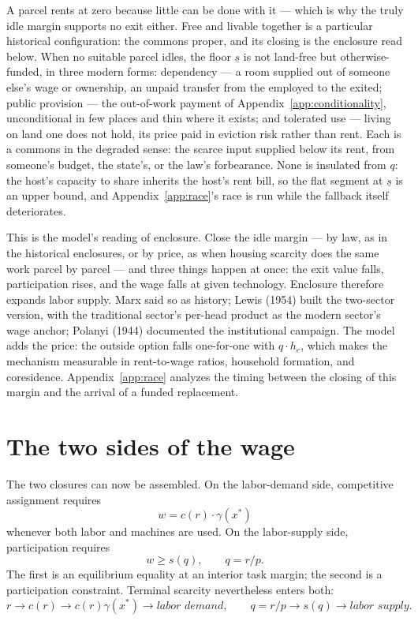 \documentclass[12pt]{article}
\theoremstyle{plain}
\begin{document}
A parcel rents at zero because little can be done with it --- which is why the truly idle margin supports no exit either. Free and livable together is a particular historical configuration: the commons proper, and its closing is the enclosure read below. When no suitable parcel idles, the floor $\underline{s}$ is not land-free but otherwise-funded, in three modern forms: dependency --- a room supplied out of someone else's wage or ownership, an unpaid transfer from the employed to the exited; public provision --- the out-of-work payment of Appendix~\ref{app:conditionality}, unconditional in few places and thin where it exists; and tolerated use --- living on land one does not hold, its price paid in eviction risk rather than rent. Each is a commons in the degraded sense: the scarce input supplied below its rent, from someone's budget, the state's, or the law's forbearance. None is insulated from $q$: the host's capacity to share inherits the host's rent bill, so the flat segment at $\underline{s}$ is an upper bound, and Appendix~\ref{app:race}'s race is run while the fallback itself deteriorates.

This is the model's reading of enclosure. Close the idle margin --- by law, as in the historical enclosures, or by price, as when housing scarcity does the same work parcel by parcel --- and three things happen at once: the exit value falls, participation rises, and the wage falls at given technology. Enclosure therefore expands labor supply. Marx said so as history; Lewis (1954) built the two-sector version, with the traditional sector's per-head product as the modern sector's wage anchor; Polanyi (1944) documented the institutional campaign. The model adds the price: the outside option falls one-for-one with $q\cdot h_e$, which makes the mechanism measurable in rent-to-wage ratios, household formation, and coresidence. Appendix~\ref{app:race} analyzes the timing between the closing of this margin and the arrival of a funded replacement.

\section{The two sides of the wage}\label{sec:interval}

The two closures can now be assembled. On the labor-demand side, competitive
assignment requires
\[
w = c(r)\cdot\gamma(x^*)
\]
whenever both labor and machines are used. On the labor-supply side,
participation requires
\[
w \ge s(q), \qquad q=r/p.
\]
The first is an equilibrium equality at
an interior task margin; the second is a participation constraint. Terminal
scarcity nevertheless enters both:
\[
r
\to c(r)
\to c(r)\gamma(x^*)
\to \textit{labor demand},
\qquad
q=r/p
\to s(q)
\to \textit{labor supply}.
\]
\end{document}
